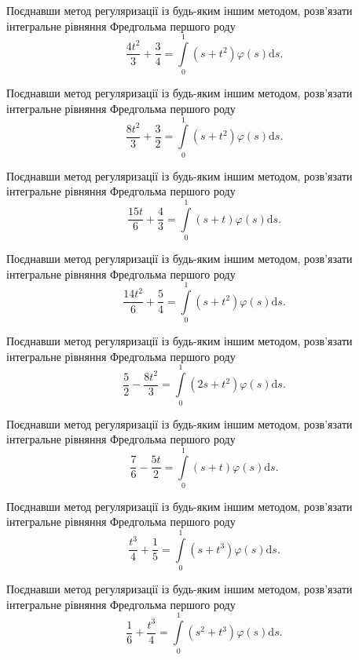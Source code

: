 \documentclass[12pt]{extarticle}
\begin{document}
\begin{Exercise}
Поєднавши метод регуляризації із будь-яким іншим методом, розв’язати інтегральне рівняння Фредгольма першого роду \[\dfrac{4t^2}{3}+\dfrac{3}{4} = \int\limits_{0}^{1} \left(s + t^2\right) \varphi(s) \mathrm{d}s.\]
\end{Exercise}

\begin{Exercise}
Поєднавши метод регуляризації із будь-яким іншим методом, розв’язати інтегральне рівняння Фредгольма першого роду \[\dfrac{8t^2}{3}+\dfrac{3}{2} = \int\limits_{0}^{1} \left(s + t^2\right) \varphi(s) \mathrm{d}s.\]
\end{Exercise}

\begin{Exercise}
Поєднавши метод регуляризації із будь-яким іншим методом, розв’язати інтегральне рівняння Фредгольма першого роду \[\dfrac{15t}{6}+\dfrac{4}{3} = \int\limits_{0}^{1} \left(s + t\right) \varphi(s) \mathrm{d}s.\]
\end{Exercise}

\begin{Exercise}
Поєднавши метод регуляризації із будь-яким іншим методом, розв’язати інтегральне рівняння Фредгольма першого роду \[\dfrac{14t^2}{6} + \dfrac{5}{4} = \int\limits_{0}^{1} \left(s + t^2\right) \varphi(s) \mathrm{d}s.\]
\end{Exercise}

\begin{Exercise}
Поєднавши метод регуляризації із будь-яким іншим методом, розв’язати інтегральне рівняння Фредгольма першого роду \[\dfrac{5}{2}-\dfrac{8t^2}{3} = \int\limits_{0}^{1} \left(2s + t^2\right) \varphi(s) \mathrm{d}s.\]
\end{Exercise}

\begin{Exercise}
Поєднавши метод регуляризації із будь-яким іншим методом, розв’язати інтегральне рівняння Фредгольма першого роду \[\dfrac{7}{6}-\dfrac{5t}{2} = \int\limits_{0}^{1} \left(s + t\right) \varphi(s) \mathrm{d}s.\]
\end{Exercise}

\begin{Exercise}
Поєднавши метод регуляризації із будь-яким іншим методом, розв’язати інтегральне рівняння Фредгольма першого роду \[\dfrac{t^3}{4}+\dfrac{1}{5} = \int\limits_{0}^{1} \left(s + t^3\right) \varphi(s) \mathrm{d}s.\]
\end{Exercise}

\begin{Exercise}
Поєднавши метод регуляризації із будь-яким іншим методом, розв’язати інтегральне рівняння Фредгольма першого роду \[\dfrac{1}{6}+\dfrac{t^3}{4} = \int\limits_{0}^{1} \left(s^2 + t^3\right) \varphi(s) \mathrm{d}s.\]
\end{Exercise}
\end{document}

